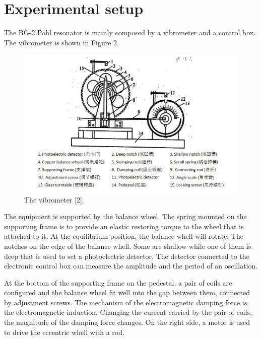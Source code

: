 \documentclass[a4paper]{report}
\begin{document}
	\section{Experimental setup}
	The BG-2 Pohl resonator is mainly composed by a vibrometer and a control box. The vibrometer is shown in Figure 2.
	\begin{figure}[H]
		\centering
		\includegraphics[width=1\linewidth]{2.jpg}
		\caption{The vibrometer [2].}
	\end{figure}
	The equipment is supported by the balance wheel. The spring mounted on the supporting frame is to provide an elastic restoring torque to the wheel that is attached to it. At the equilibrium position, the balance whell will rotate. The notches on the edge of the balance whell. Some are shallow while one of them is deep that is used to set a photoelectric detector. The detector connected to the electronic control box can measure the amplitude and the period of an 
	oscillation.
	
	At the bottom of the supporting frame on the pedestal, a pair of coils are configured and the balance wheel fit well into the gap between them, connected by adjustment screws. The mechanism of the electromagnetic damping force is the electromagnetic induction. Changing the current carried by the pair of coils, the magnitude of the damping force changes. On the right side, a motor is used to drive the eccentric whell with a rod.
	
\end{document}
